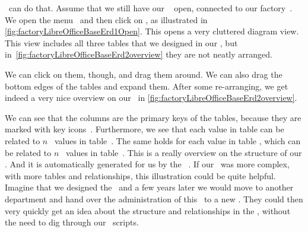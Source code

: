 \libreofficeBase\ can do that.
Assume that we still have our \libreofficeBase\  open, connected to our factory~\db.
We open the menu~ and then click on , as illustrated in \cref{fig:factoryLibreOfficeBaseErd1Open}.
This opens a very cluttered diagram view.
This view includes all three tables that we designed in our \db, but in~\cref{fig:factoryLibreOfficeBaseErd2overview} they are not neatly arranged.

We can click on them, though, and drag them around.
We can also drag the bottom edges of the tables and expand them.
After some re-arranging, we get indeed a very nice overview on our \db\ in \cref{fig:factoryLibreOfficeBaseErd2overview}.

We can see that the  columns are the primary keys of the tables, because they are marked with key icons~\libreOfficeBaseKey.
Furthermore, we see that each  value in table  can be related to $n$~ values in table~.
The same holds for each  value in table , which can be related to $n$~ values in table~.
This  is a really overview on the structure of our \db.
And it is automatically generated for us by the \libreofficeBase\ .
If our \db\ was more complex, with more tables and relationships, this illustration could be quite helpful.
Imagine that we designed the \db\ and a few years later we would move to another department and hand over the administration of this \db\ to a new .
They could then very quickly get an idea about the structure and relationships in the \db, without the need to dig through our \sql\ scripts.%
%
\FloatBarrier%
\endhsection%
%
